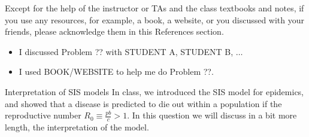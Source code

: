 \documentclass[addpoints, 11pt]{exam}
\begin{document}
 Except for the help of the instructor or TAs and the class textbooks and notes, if you use any resources, for example, a book, a website, or you discussed with your friends, please acknowledge them in this References section. 
\begin{itemize}
\item I discussed Problem ?? with STUDENT A, STUDENT B, $\ldots$
\item I used BOOK/WEBSITE to help me do Problem ??.
\end{itemize}
\vspace{.05cm}
\begin{questions}
\question  Interpretation of SIS models In class, we introduced the SIS model for epidemics, and showed that a disease is predicted to die out within a population if the reproductive number $R_0 \equiv \frac{p b}{c}>1$. In this question we will discuss in a bit more length, the interpretation of the model.
\end{questions}
\end{document}
